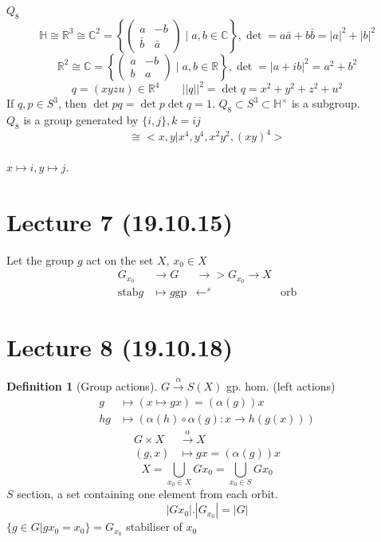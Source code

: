 \documentclass{article}
\newcommand{\R}{\mathbb{R}}
\newcommand{\C}{\mathbb{C}}
\renewcommand{\H}{\mathbb{H}}
\newcommand{\abs}[1]{\left|#1\right|}
\newcommand{\stab}{\mathrm{stab}}
\newcommand{\orb}{\mathrm{orb}}
\newcommand{\gp}{\mathrm{gp}}
\theoremstyle{definition}
\newtheorem{definition}{Definition}[section]
\theoremstyle{remark}
\theoremstyle{example}
\begin{document}
		$Q_8$\\
		\[ \H \cong \R^3 \cong \C^2 = \left\{ \begin{pmatrix}
			a & -b\\
			\bar{b} & \bar{a}
		\end{pmatrix} \mid a,b \in \C \right\}, \det=a \bar{a}+b \bar{b} = |a|^2+|b|^2 \]
		\[ \R^2 \cong \C = \left\{ \begin{pmatrix}
			a & -b\\
			b & a
		\end{pmatrix} \mid a,b \in \R \right\}, \det = |a+ib|^2=a^2+b^2 \]		
		\[ q=(xyzu) \in \R^4 \qquad ||q||^2 = \det q = x^2 + y^2 + z^2 + u^2 \]
		If $q,p \in S^3$, then $\det pq = \det p \det q = 1$.
		$Q_8 \subset S^3 \subset \H^\times$ is a subgroup.\\
		$Q_8$ is a group generated by $\{ i,j\}, k=ij$\\
		\[\cong <x,y|x^4,y^4,x^2y^2,(xy)^4>\]\\
		$x \mapsto i, y \mapsto j$.


		\section*{Lecture 7 (19.10.15)}
		Let the group $g$ act on the set $X$, $x_0 \in X$
		\begin{align*}
		G_{x_0} & \to G & \to > G_{x_0} \to X\\
		\stab g & \mapsto g \gp & \leftarrow^s & \orb
		\end{align*}
		
		\section*{Lecture 8 (19.10.18)}
		\begin{definition}[Group actions]
			$G \overset{\alpha}{\to}S(X)$ gp. hom.
			(left actions)
			\begin{align*}
				g & \mapsto (x \mapsto gx)=(\alpha(g))x\\
				hg & \mapsto (\alpha(h) \circ \alpha(g):x \to h(g(x)))
			\end{align*}
			\begin{align*}
			G \times X &\overset{\alpha}{\to} X\\
			(g,x) & \mapsto gx=(\alpha(g))x
			\end{align*}
			\[X=\bigcup_{x_0 \in X}Gx_0=\bigcup_{x_0 \in S}Gx_0\]
			$S$ section, a set containing one element from each orbit.
			\[\abs{Gx_0}.\abs{G_{x_0}} = \abs{G} \]
			$\{g \in G|gx_0=x_0\}=G_{x_0}$ stabiliser of $x_0$
		\end{definition}
	
\end{document}
